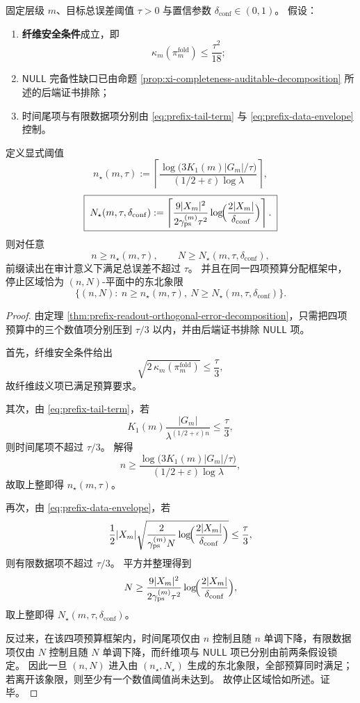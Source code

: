 \begin{theorem}[四项正交审计下的显式停止前沿]\label{thm:prefix-audit-explicit-stopping-frontier}
固定层级 \(m\)、目标总误差阈值 \(\tau>0\) 与置信参数 \(\delta_{\mathrm{conf}}\in(0,1)\)。
假设：
\begin{enumerate}
  \item \textbf{纤维安全条件}成立，即
  \[
  \kappa_m(\pi_m^{\mathrm{fold}})\le \frac{\tau^2}{18};
  \]
  \item \(\mathsf{NULL}\) 完备性缺口已由命题 \ref{prop:xi-completeness-auditable-decomposition} 所述的后端证书排除；
  \item 时间尾项与有限数据项分别由 \eqref{eq:prefix-tail-term} 与 \eqref{eq:prefix-data-envelope} 控制。
\end{enumerate}
定义显式阈值
\[
\boxed{\;
n_\star(m,\tau)
:=
\left\lceil
\frac{\log\!\bigl(3K_1(m)|G_m|/\tau\bigr)}
{(1/2+\varepsilon)\log\lambda}
\right\rceil,\;}
\]
\[
\boxed{\;
N_\star(m,\tau,\delta_{\mathrm{conf}})
:=
\left\lceil
\frac{9|X_m|^2}{2\gamma_{\mathrm{ps}}^{(m)}\tau^2}
\log\!\Bigl(\frac{2|X_m|}{\delta_{\mathrm{conf}}}\Bigr)
\right\rceil.\;}
\]
则对任意
\[
n\ge n_\star(m,\tau),
\qquad
N\ge N_\star(m,\tau,\delta_{\mathrm{conf}}),
\]
前缀读出在审计意义下满足总误差不超过 \(\tau\)。
并且在同一四项预算分配框架中，停止区域恰为 \((n,N)\)-平面中的东北象限
\[
\boxed{\;
\{(n,N):\ n\ge n_\star(m,\tau),\ N\ge N_\star(m,\tau,\delta_{\mathrm{conf}})\}.\;}
\]
\end{theorem}
\begin{proof}
由定理 \ref{thm:prefix-readout-orthogonal-error-decomposition}，只需把四项预算中的三个数值项分别压到 \(\tau/3\) 以内，并由后端证书排除 \(\mathsf{NULL}\) 项。

首先，纤维安全条件给出
\[
\sqrt{2\,\kappa_m(\pi_m^{\mathrm{fold}})}\le \frac{\tau}{3},
\]
故纤维歧义项已满足预算要求。

其次，由 \eqref{eq:prefix-tail-term}，若
\[
K_1(m)\frac{|G_m|}{\lambda^{(1/2+\varepsilon)n}}\le \frac{\tau}{3},
\]
则时间尾项不超过 \(\tau/3\)。
解得
\[
n\ge
\frac{\log\!\bigl(3K_1(m)|G_m|/\tau\bigr)}
{(1/2+\varepsilon)\log\lambda},
\]
故取上整即得 \(n_\star(m,\tau)\)。

再次，由 \eqref{eq:prefix-data-envelope}，若
\[
\frac12|X_m|
\sqrt{
\frac{2}{\gamma_{\mathrm{ps}}^{(m)}N}
\log\!\Bigl(\frac{2|X_m|}{\delta_{\mathrm{conf}}}\Bigr)}
\le \frac{\tau}{3},
\]
则有限数据项不超过 \(\tau/3\)。
平方并整理得到
\[
N\ge
\frac{9|X_m|^2}{2\gamma_{\mathrm{ps}}^{(m)}\tau^2}
\log\!\Bigl(\frac{2|X_m|}{\delta_{\mathrm{conf}}}\Bigr),
\]
取上整即得 \(N_\star(m,\tau,\delta_{\mathrm{conf}})\)。

反过来，在该四项预算框架内，时间尾项仅由 \(n\) 控制且随 \(n\) 单调下降，有限数据项仅由 \(N\) 控制且随 \(N\) 单调下降，而纤维项与 \(\mathsf{NULL}\) 项已分别由前两条假设锁定。
因此一旦 \((n,N)\) 进入由 \((n_\star,N_\star)\) 生成的东北象限，全部预算同时满足；若离开该象限，则至少有一个数值阈值尚未达到。
故停止区域恰如所述。证毕。
\end{proof}
